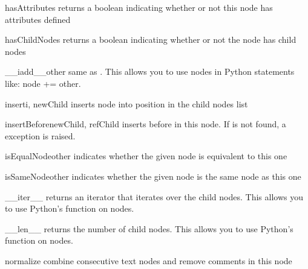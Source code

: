 \begin{methoddesc}[Node]{hasAttributes}{}
returns a boolean indicating whether or not this node has attributes defined
\end{methoddesc}

\begin{methoddesc}[Node]{hasChildNodes}{}
returns a boolean indicating whether or not the node has child nodes
\end{methoddesc}

\begin{methoddesc}[Node]{__iadd__}{other}
same as .  This allows you to use nodes in Python statements
like: node += other.
\end{methoddesc}

\begin{methoddesc}[Node]{insert}{i, newChild}
inserts node  into position  in the child nodes list
\end{methoddesc}

\begin{methoddesc}[Node]{insertBefore}{newChild, refChild}
inserts  before  in this node.  If 
is not found, a  exception is raised.
\end{methoddesc}

\begin{methoddesc}[Node]{isEqualNode}{other}
indicates whether the given node is equivalent to this one
\end{methoddesc}

\begin{methoddesc}[Node]{isSameNode}{other}
indicates whether the given node is the same node as this one
\end{methoddesc}

\begin{methoddesc}[Node]{__iter__}{}
returns an iterator that iterates over the child nodes.  This allows you to
use Python's  function on nodes.
\end{methoddesc}

\begin{methoddesc}[Node]{__len__}{}
returns the number of child nodes.  This allows you to use Python's 
 function on nodes.
\end{methoddesc}

\begin{methoddesc}[Node]{normalize}{}
combine consecutive text nodes and remove comments in this node
\end{methoddesc}

